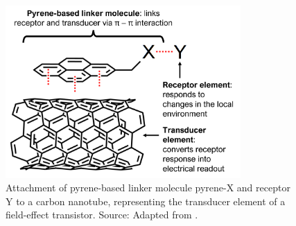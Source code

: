 \documentclass[
  a4paper,
]{scrbook}
\begin{document}
\begin{figure}

{\centering \includegraphics[width=0.8\textwidth,height=\textheight]{./figures/ch6/pyrene-cnt.png}

}

\caption{\label{fig-pi-interaction-cnt}Attachment of pyrene-based linker
molecule pyrene-X and receptor Y to a carbon nanotube, representing the
transducer element of a field-effect transistor. Source: Adapted from
\autocite{Carbonnanotube}.}

\end{figure}

\newpage
{}
\end{document}
